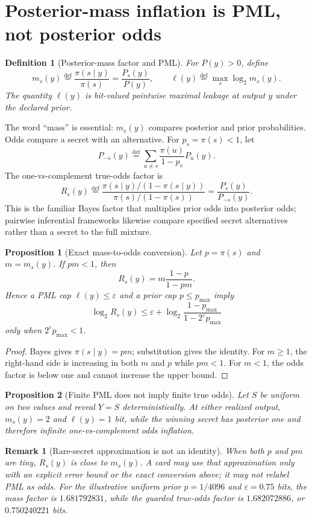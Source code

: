 \documentclass[11pt]{article}
\newcommand{\defeq}{\stackrel{\mathrm{def}}{=}}
\newtheorem{definition}{Definition}
\newtheorem{proposition}{Proposition}
\newtheorem{remark}{Remark}
\begin{document}
\section{Posterior-mass inflation is PML, not posterior odds}
\begin{definition}[Posterior-mass factor and PML]
For $P(y)>0$, define
\[
m_s(y)\defeq\frac{\pi(s\mid y)}{\pi(s)}=\frac{P_s(y)}{P(y)},
\qquad
\ell(y)\defeq\max_s\log_2 m_s(y).
\]
The quantity $\ell(y)$ is bit-valued pointwise maximal leakage at output $y$ under the declared prior.\cite{saeidian2023pml}
\end{definition}

The word ``mass'' is essential: $m_s(y)$ compares posterior and prior probabilities.
Odds compare a secret with an alternative.
For $p_s=\pi(s)<1$, let
\[
P_{-s}(y)\defeq\sum_{u\ne s}\frac{\pi(u)}{1-p_s}P_u(y).
\]
The one-vs-complement true-odds factor is
\[
R_s(y)\defeq
\frac{\pi(s\mid y)/(1-\pi(s\mid y))}{\pi(s)/(1-\pi(s))}
=\frac{P_s(y)}{P_{-s}(y)}.
\]
This is the familiar Bayes factor that multiplies prior odds into posterior odds; pairwise inferential frameworks likewise compare specified secret alternatives rather than a secret to the full mixture.\cite{KiferMachanavajjhala2014Pufferfish}

\begin{proposition}[Exact mass-to-odds conversion]
Let $p=\pi(s)$ and $m=m_s(y)$.
If $pm<1$, then
\[
R_s(y)=m\frac{1-p}{1-pm}.
\]
Hence a PML cap $\ell(y)\le\varepsilon$ and a prior cap $p\le p_{\max}$ imply
\[
\log_2R_s(y)
\le
\varepsilon+\log_2\frac{1-p_{\max}}{1-2^\varepsilon p_{\max}}
\]
only when $2^\varepsilon p_{\max}<1$.
\end{proposition}

\begin{proof}
Bayes gives $\pi(s\mid y)=pm$; substitution gives the identity.
For $m\ge1$, the right-hand side is increasing in both $m$ and $p$ while $pm<1$.
For $m<1$, the odds factor is below one and cannot increase the upper bound.
\end{proof}

\begin{proposition}[Finite PML does not imply finite true odds]
Let $S$ be uniform on two values and reveal $Y=S$ deterministically.
At either realized output, $m_s(y)=2$ and $\ell(y)=1$ bit, while the winning secret has posterior one and therefore infinite one-vs-complement odds inflation.
\end{proposition}

\begin{remark}[Rare-secret approximation is not an identity]
When both $p$ and $pm$ are tiny, $R_s(y)$ is close to $m_s(y)$.
A card may use that approximation only with an explicit error bound or the exact conversion above; it may not relabel PML as odds.
For the illustrative uniform prior $p=1/4096$ and $\varepsilon=0.75$ bits, the mass factor is $1.681792831$, while the guarded true-odds factor is $1.682072886$, or $0.750240221$ bits.
\end{remark}
\end{document}
